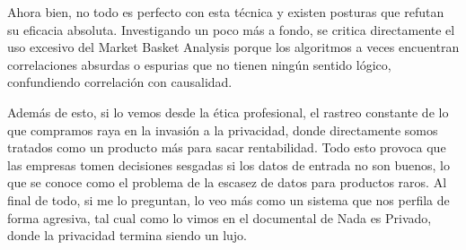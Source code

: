 \documentclass[letterpaper,11pt]{article}
\begin{document}
Ahora bien, no todo es perfecto con esta técnica y existen posturas que refutan su eficacia absoluta. Investigando un poco más a fondo, se critica directamente el uso excesivo del Market Basket Analysis porque los algoritmos a veces encuentran correlaciones absurdas o espurias que no tienen ningún sentido lógico, confundiendo correlación con causalidad. 

Además de esto, si lo vemos desde la ética profesional, el rastreo constante de lo que compramos raya en la invasión a la privacidad, donde directamente somos tratados como un producto más para sacar rentabilidad. Todo esto provoca que las empresas tomen decisiones sesgadas si los datos de entrada no son buenos, lo que se conoce como el problema de la escasez de datos para productos raros. Al final de todo, si me lo preguntan, lo veo más como un sistema que nos perfila de forma agresiva, tal cual como lo vimos en el documental de Nada es Privado, donde la privacidad termina siendo un lujo.

\vspace{0.5cm}

\newpage

\nocite{*}


\end{document}
